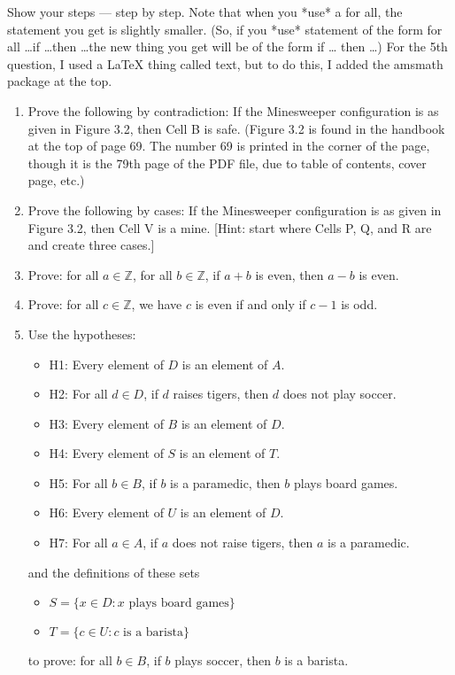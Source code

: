 \documentclass{article}
\begin{document}
Show your steps --- step by step. Note that when you *use* a for all, the
statement you get is slightly smaller. (So, if you *use* statement of the form
for all \ldots if \ldots then \dots the new thing you get will be of the form if \ldots
then \ldots) For the 5th question, I used a LaTeX thing called text, but to do
this, I added the amsmath package at the top.
\begin{enumerate}

    \item Prove the following by contradiction: If the Minesweeper configuration is as
          given in Figure 3.2, then Cell B is safe. (Figure 3.2 is found in the handbook
          at the top of page 69. The number 69 is printed in the corner of the page,
          though it is the 79th page of the PDF file, due to table of contents, cover
          page, etc.)

    \newpage

    \item Prove the following by cases: If the Minesweeper configuration is as given in
          Figure 3.2, then Cell V is a mine. [Hint: start where Cells P, Q, and R are and
                  create three cases.]

    \newpage

    \item Prove: for all $a \in \mathbb{Z}$, for all $b \in \mathbb{Z}$, if $a+b$ is
          even, then $a-b$ is even.

    \newpage

    \item Prove: for all $c \in \mathbb{Z}$, we have $c$ is even if and only if $c-1$ is
          odd.

    \newpage

    \item Use the hypotheses:
          \begin{itemize}
              \item H1: Every element of $D$ is an element of $A$.
              \item H2: For all $d \in D$, if $d$ raises tigers, then $d$ does not play soccer.
              \item H3: Every element of $B$ is an element of $D$.
              \item H4: Every element of $S$ is an element of $T$.
              \item H5: For all $b \in B$, if $b$ is a paramedic, then $b$ plays board games.
              \item H6: Every element of $U$ is an element of $D$.
              \item H7: For all $a \in A$, if $a$ does not raise tigers, then $a$ is a paramedic.
          \end{itemize}
          and the definitions of these sets
          \begin{itemize}
              \item $S = \{x \in D : x \text{ plays board games}\}$
              \item $T = \{c \in U : c \text{ is a barista}\}$
          \end{itemize}
          to prove: for all $b \in B$, if $b$ plays soccer, then $b$ is a barista.

\end{enumerate}
\end{document}
